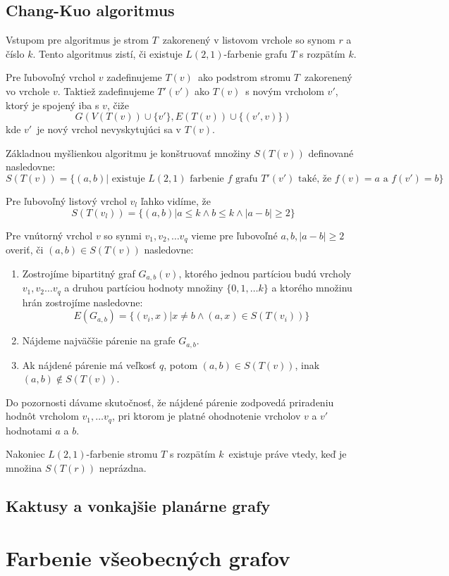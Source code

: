 \subsection{Chang-Kuo algoritmus}

Vstupom pre algoritmus je strom $T$ zakorenený v listovom vrchole so synom $r$ a číslo $k$.
Tento algoritmus zistí, či existuje $L(2,1)$-farbenie grafu $T$ s rozpätím $k$.

Pre ľubovoľný
vrchol $v$ zadefinujeme $T(v)$ ako podstrom stromu $T$ zakorenený vo vrchole $v$. Taktiež
zadefinujeme $T'(v')$ ako $T(v)$ s novým vrcholom $v'$, ktorý je spojený iba s $v$, čiže
$$ G\left(V(T(v)) \cup \{ v' \}, E(T(v)) \cup \{ (v', v)\} \right) $$
kde $v'$ je nový vrchol nevyskytujúci sa v $T(v)$.

Základnou myšlienkou algoritmu je konštruovať množiny $S(T(v))$ definované nasledovne:
$$S(T(v)) = \{ (a, b) | \textrm{ existuje } L(2,1) \textrm{ farbenie } f \textrm{ grafu } T'(v') \textrm{ také, že } f(v) = a \textrm{ a } f(v') = b\}$$

Pre ľubovoľný listový vrchol $v_l$ ľahko vidíme, že 
$$S(T(v_l)) = \{ (a, b) | a \leq k \wedge b \leq k \wedge |a - b| \ge 2\}$$

Pre vnútorný vrchol $v$ so synmi $v_1, v_2, \ldots v_q$ vieme pre ľubovoľné $a, b, |a - b| \ge 2$ overiť,
či $(a, b) \in S(T(v))$ nasledovne:

\begin{enumerate}
\item Zostrojíme bipartitný graf $G_{a,b}(v)$, ktorého jednou partíciou budú vrcholy $v_1, v_2 \ldots v_q$ a
druhou partíciou hodnoty množiny $\{0, 1, \ldots k\}$ a ktorého množinu hrán zostrojíme nasledovne:
$$E(G_{a,b}) = \{ (v_i, x) | x \neq b \wedge (a, x) \in S(T(v_i))\}$$

\item Nájdeme najväčšie párenie na grafe $G_{a,b}$.

\item Ak nájdené párenie má veľkosť $q$, potom $(a,b) \in S(T(v))$, inak $(a,b) \notin S(T(v))$.
\end{enumerate}

Do pozornosti dávame skutočnosť, že nájdené párenie zodpovedá priradeniu hodnôt vrcholom
$v_1, \ldots v_q$, pri ktorom je platné ohodnotenie vrcholov $v$ a $v'$ hodnotami $a$ a $b$.

Nakoniec $L(2,1)$-farbenie stromu $T$ s rozpätím $k$ existuje práve vtedy, keď je množina
$S(T(r))$ neprázdna.

\subsection{Kaktusy a vonkajšie planárne grafy}



\section{Farbenie všeobecných grafov}
